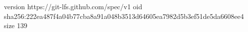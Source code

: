 version https://git-lfs.github.com/spec/v1
oid sha256:222ea487f4a04b77cba8a91a048b3513d64605ea7982d5b3ef51de5da6608ee4
size 139
